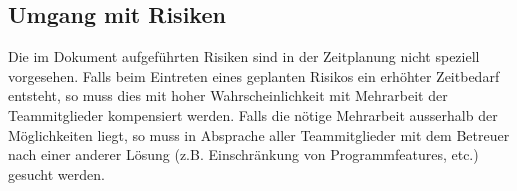\subsection{Umgang mit Risiken}
Die im Dokument aufgeführten Risiken sind in der Zeitplanung nicht speziell vorgesehen. Falls beim Eintreten eines geplanten Risikos ein erhöhter Zeitbedarf entsteht, so muss dies mit hoher Wahrscheinlichkeit mit Mehrarbeit der Teammitglieder kompensiert werden. Falls die nötige Mehrarbeit ausserhalb der Möglichkeiten liegt, so muss in Absprache aller Teammitglieder mit dem Betreuer nach einer anderer Lösung (z.B. Einschränkung von Programmfeatures, etc.) gesucht werden.